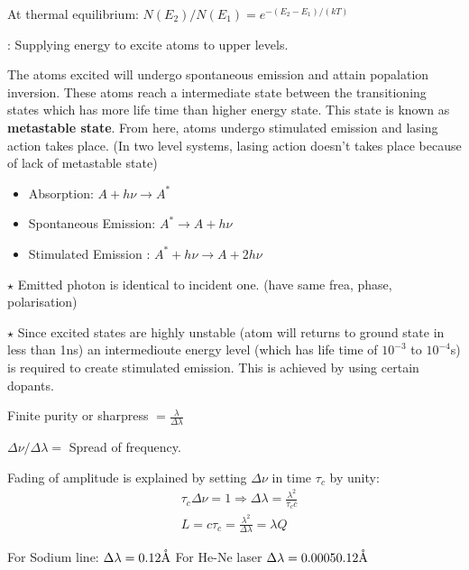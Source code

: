 \documentclass[12pt, a4paper]{article}
\begin{document}

At thermal equilibrium: $N\left(E_2\right) / N\left(E_1\right)=e ^ {-\left(E_2-E_1\right) / (kT)}$

: Supplying energy to excite atoms to upper levels.


The atoms excited will undergo spontaneous emission and attain popalation inversion. These atoms reach a intermediate state between the transitioning states which has more life time than higher energy state. This state is known as \textbf{metastable state}. From here, atoms undergo stimulated emission and lasing action takes place. (In two level systems, lasing action doesn't takes place because of lack of metastable state)


\begin{itemize}
	\item Absorption: $A+h\nu \rightarrow A^{*}$
	\item Spontaneous Emission: $A^{*} \rightarrow A+h\nu$
	\item Stimulated Emission : $A^{*}+h\nu \rightarrow A+2 h\nu$
\end{itemize}
$\star$ Emitted photon is identical to incident one. (have same frea, phase, polarisation)

$\star$ Since excited states are highly unstable (atom will returns to ground state in less than 1ns) an intermedioute energy level (which has life time of $10^{-3}$ to $10^{-4}$s) is required to create stimulated emission. This is achieved by using certain dopants.



Finite purity or sharpress $=\frac{\lambda}{\Delta \lambda}$

$\Delta \nu / \Delta\lambda=$ Spread of frequency.

Fading of amplitude is explained by setting $\Delta\nu$ in time $\tau_c$ by unity:
$$
	\begin{aligned}
		 & \tau_c \Delta \nu=1 \Rightarrow \Delta \lambda=\frac{\lambda^2}{\tau_c c} \\
		 & L=c \tau_c=\frac{\lambda^2}{\Delta \lambda}= \lambda Q
	\end{aligned}
$$

For Sodium line: $\Delta \lambda = 0.12\mathring{\textrm{A}}$
For He-Ne laser $\Delta \lambda = 0.0005 0.12\mathring{\textrm{A}}$

\bigskip
\end{document}
